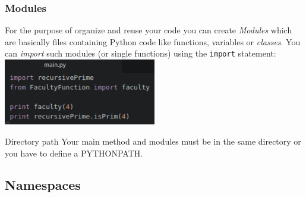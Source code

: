 \documentclass{beamer}
\begin{document}
\begin{frame}
\frametitle{Modules}
	For the purpose of organize and reuse your code you can create \textit{Modules} which are basically files containing Python code like functions, variables or \textit{classes}. You can \textit{import} such modules (or single functions) using the \texttt{import} statement:
	\includegraphics[width = 0.5\textwidth]{ImportStatements.pdf}
	\begin{alertblock}{Directory path}
		Your main method and modules must be in the same directory or you have to define a PYTHONPATH.
	\end{alertblock}
\end{frame}
	
	\subsection{Namespaces}
	
\end{document}
